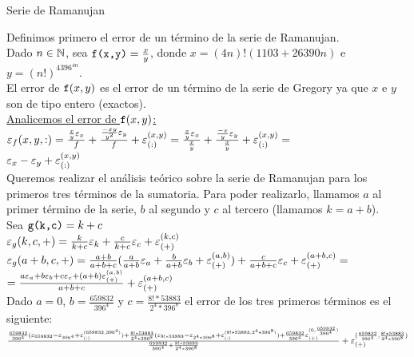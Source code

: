 \begin{section}{Serie de Ramanujan}
	\large
	
	Definimos primero el error de un término de la serie de Ramanujan.\\

	Dado $n \in \mathbb{N}$, sea $\texttt{f(x,y)}=\frac{x}{y}$, donde $x=(4n)!(1103+26390n)$ e $y=(n!)^4396^{4n}$.\\
	
	El error de $\texttt{f}(x,y)$ es el error de un término de la serie de Gregory ya que $x$ e $y$ son de tipo entero (exactos).\\
	
	\underline{Analicemos el error de $\texttt{f}(x,y)$:}\\
	
	$\texttt{$\varepsilon _{f}({x,y,:})$}=\frac{\frac{x}{y}\varepsilon _{x}}{f} + \frac{\frac{-xy}{y^2}\varepsilon _{y}}{f} + \varepsilon _{({:})}^{({x,y})} = 
	\frac{\frac{x}{y}\varepsilon _{x}}{\frac{x}{y}} + \frac{\frac{-x}{y}\varepsilon _{y}}{\frac{x}{y}} + \varepsilon _{({:})}^{({x,y})} =$\\
	
	$\varepsilon _{x} - \varepsilon _{y} + \varepsilon _{({:})}^{({x,y})}$\\

	Queremos realizar el análisis teórico sobre la serie de Ramanujan para los primeros tres términos de la sumatoria. Para poder realizarlo, llamamos $a$ al primer término de la serie,
	$b$ al segundo y $c$ al tercero (llamamos $k=a+b$).\\
	
	Sea $\texttt{g(k,c)}=k+c$\\
	
	$\varepsilon _{g}({k,c,+}) = \frac{k}{k+c}\varepsilon _{k} + \frac{c}{k+c}\varepsilon _{c} + \varepsilon _{({+})}^{({k,c})}$\\
	
	$\varepsilon _{g}({a+b,c,+}) = \frac{a+b}{a+b+c}(\frac{a}{a+b}\varepsilon _{a} + \frac{b}{a+b}\varepsilon _{b} + \varepsilon _{({+})}^{({a,b})}) + \frac{c}{a+b+c}\varepsilon _{c} + \varepsilon _{({+})}^{({a+b,c})} =$\\
	 
	$= \frac{a\varepsilon _{a} + b\varepsilon _{b} + c\varepsilon _{c} + (a+b)\varepsilon _{({+})}^{({a,b})}}{a+b+c} + \varepsilon _{({+})}^{({a+b,c})}$\\
	
	Dado $a=0$, $b=\frac{659832}{396^4}$ y $c=\frac{8!*53883}{2^4*396^8}$ el error de los tres primeros términos es el siguiente:\\
	
	$\frac{\frac{659832}{396^4}(\varepsilon _{659832} - \varepsilon _{396^4} + \varepsilon _{({:})}^{({659832,396^4})}) + \frac{8!*53883}{2^4*396^8}(\varepsilon _{8!*53883} - \varepsilon _{2^4*396^8} + \varepsilon _{({:})}^{({8!*53883,2^4*396^8})}) + \frac{659832}{396^4}\varepsilon _{({+})}^{({0,\frac{659832}{396^4}})}}{\frac{659832}{396^4}+\frac{8!*53883}{2^4*396^8}} + \varepsilon _{({+})}^{({\frac{659832}{396^4},\frac{8!*53883}{2^4*396^8}})}$\\
	

\end{section}
